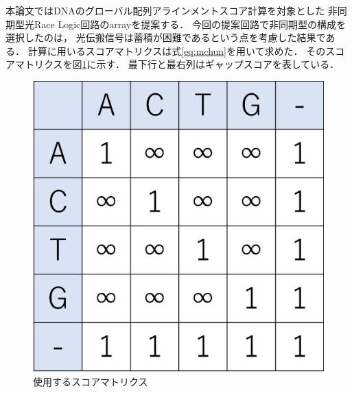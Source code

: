 本論文ではDNAのグローバル配列アラインメントスコア計算を対象とした
非同期型光Race Logic回路のarrayを提案する．
今回の提案回路で非同期型の構成を選択したのは，
光伝搬信号は蓄積が困難であるという点を考慮した結果である．
計算に用いるスコアマトリクスは式\ref{eq:mchun}を用いて求めた．
そのスコアマトリクスを図\ref{fig:scorematrix_3}に示す．
最下行と最右列はギャップスコアを表している．
\begin{figure}[t!]
\begin{center}
\includegraphics[keepaspectratio,scale=0.4]{fig/3/scorematrix.eps}
\caption{使用するスコアマトリクス}
\label{fig:scorematrix_3}
\end{center}
\end{figure}

